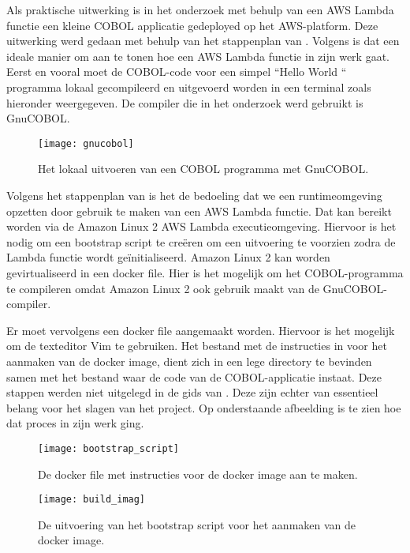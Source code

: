 \newpage

Als praktische uitwerking is in het onderzoek met behulp van een AWS Lambda functie een kleine COBOL applicatie gedeployed op het AWS-platform. Deze uitwerking werd gedaan met behulp van het stappenplan van \textcite{Paika2020}. Volgens \textcite{Paika2020} is dat een ideale manier om aan te tonen hoe een AWS Lambda functie in zijn werk gaat. Eerst en vooral moet de COBOL-code voor een simpel ``Hello World `` programma lokaal gecompileerd en uitgevoerd worden in een terminal zoals hieronder weergegeven. De compiler die in het onderzoek werd gebruikt is GnuCOBOL.  
    \begin{figure}[h]
        \centering
        \texttt{[image: gnucobol]}
        \caption{Het lokaal uitvoeren van een COBOL programma met GnuCOBOL.}
     \end{figure}
 
 \newpage
 
 Volgens het stappenplan van \textcite{Paika2020} is het de bedoeling dat we een runtimeomgeving opzetten door gebruik te maken van een AWS Lambda functie. Dat kan bereikt worden via de Amazon Linux 2 AWS Lambda executieomgeving. Hiervoor is het nodig om een bootstrap script te creëren om een uitvoering te voorzien zodra de Lambda functie wordt geïnitialiseerd. Amazon Linux 2 kan worden gevirtualiseerd in een docker file. Hier is het mogelijk om het COBOL-programma te compileren omdat Amazon Linux 2 ook gebruik maakt van de  GnuCOBOL-compiler. 
 
 Er moet vervolgens een docker file aangemaakt worden. Hiervoor is het mogelijk om de texteditor Vim te gebruiken. Het bestand met de instructies in voor het aanmaken van de docker image, dient zich in een lege directory te bevinden samen met het bestand waar de code van de COBOL-applicatie instaat. Deze stappen werden niet uitgelegd in de gids van \textcite{Paika2020}. Deze zijn echter van essentieel belang voor het slagen van het project. Op onderstaande afbeelding is te zien hoe dat proces in zijn werk ging. 
 
  \begin{figure}[h]
     \centering
     \texttt{[image: bootstrap\_script]}
     \caption{De docker file met instructies voor de docker image aan te maken.}
 \end{figure}

  \begin{figure}[h]
    \centering
    \texttt{[image: build\_imag]}
    \caption{De uitvoering van het bootstrap script voor het aanmaken van de docker image.}
\end{figure}

